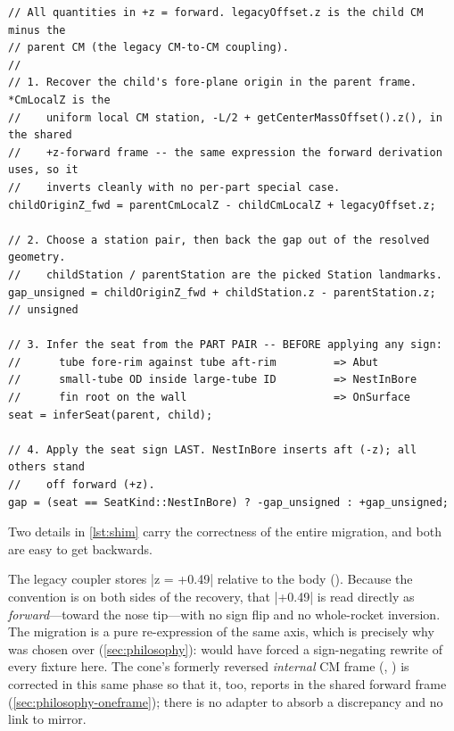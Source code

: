 \begin{listing}[htbp]
\begin{verbatim}
// All quantities in +z = forward. legacyOffset.z is the child CM minus the
// parent CM (the legacy CM-to-CM coupling).
//
// 1. Recover the child's fore-plane origin in the parent frame. *CmLocalZ is the
//    uniform local CM station, -L/2 + getCenterMassOffset().z(), in the shared
//    +z-forward frame -- the same expression the forward derivation uses, so it
//    inverts cleanly with no per-part special case.
childOriginZ_fwd = parentCmLocalZ - childCmLocalZ + legacyOffset.z;

// 2. Choose a station pair, then back the gap out of the resolved geometry.
//    childStation / parentStation are the picked Station landmarks.
gap_unsigned = childOriginZ_fwd + childStation.z - parentStation.z;  // unsigned

// 3. Infer the seat from the PART PAIR -- BEFORE applying any sign:
//      tube fore-rim against tube aft-rim         => Abut
//      small-tube OD inside large-tube ID         => NestInBore
//      fin root on the wall                       => OnSurface
seat = inferSeat(parent, child);

// 4. Apply the seat sign LAST. NestInBore inserts aft (-z); all others stand
//    off forward (+z).
gap = (seat == SeatKind::NestInBore) ? -gap_unsigned : +gap_unsigned;
\end{verbatim}
\caption{The \code{[[deprecated]]} shim's analytic recovery of a
 from a legacy CM-to-CM . It uses the same uniform local-CM
expression as the forward derivation (\cref{sec:datamodel}), so the recovery inverts it exactly
for every part, the cone included.}\label{lst:shim}
\end{listing}

Two details in \cref{lst:shim} carry the correctness of the entire migration, and both
are easy to get backwards.

\begin{keyinsight}
The legacy  coupler stores \cppinline|z = +0.49| relative to the body
(). Because the convention is \zfwd{} on both
sides of the recovery, that \cppinline|+0.49| is read directly as \emph{forward}---toward
the nose tip---with no sign flip and no whole-rocket inversion. The migration is a pure
re-expression of the same axis, which is precisely why \zfwd{} was chosen over \zaft{}
(\cref{sec:philosophy}): \zaft{} would have forced a sign-negating rewrite of every
fixture here. The cone's formerly reversed \emph{internal} CM frame
(, ) is corrected in this same
phase so that it, too, reports in the shared forward frame
(\cref{sec:philosophy-oneframe}); there is no adapter to absorb a discrepancy and no link to
mirror.
\end{keyinsight}


